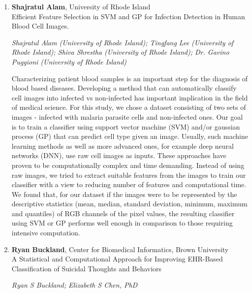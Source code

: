 
\begin{enumerate}
\item \textbf{Shajratul Alam}, University of Rhode Island \\
Efficient Feature Selection in SVM and GP for Infection Detection in Human Blood Cell Images.

\emph{\footnotesize Shajratul Alam (University of Rhode Island); Tingfang Lee (University of Rhode Island); Shiva Shrestha (University of Rhode Island); Dr. Gavino Puggioni (University of Rhode Island)}

Characterizing patient blood samples is an important step for the diagnosis of blood based diseases. Developing a method that can automatically classify cell images into infected vs non-infected has important implication in the field of medical science. For this study, we chose a dataset consisting of two sets of images - infected with malaria parasite cells and non-infected ones. Our goal is to train a classifier using support vector machine (SVM) and/or gaussian process (GP) that can predict cell type given an image. Usually, such machine learning methods as well as more advanced ones, for example deep neural networks (DNN), use raw cell images as inputs. These approaches have proven to be computationally complex and time demanding. Instead of using raw images, we tried to extract suitable features from the images to train our classifier with a view to reducing number of features and computational time. We found that, for our dataset if the images were to be represented by the descriptive statistics (mean, median, standard deviation, minimum, maximum and quantiles) of RGB channels of the pixel values, the resulting classifier using SVM or GP performs well enough in comparison to those requiring intensive computation.

\item \textbf{Ryan Buckland}, Center for Biomedical Informatics, Brown University \\
A Statistical and Computational Approach for Improving EHR-Based Classification of Suicidal Thoughts and Behaviors

\emph{\footnotesize Ryan S Buckland; Elizabeth S Chen, PhD}


\end{enumerate}
